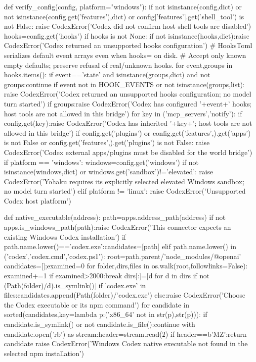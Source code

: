 def verify_config(config, platform="windows"):
    if not isinstance(config,dict) or not isinstance(config.get('features'),dict) or config['features'].get('shell_tool') is not False:
        raise CodexError('Codex did not confirm host shell tools are disabled')
    hooks=config.get('hooks')
    if hooks is not None:
        if not isinstance(hooks,dict):raise CodexError('Codex returned an unsupported hooks configuration')
        # HooksToml serializes default event arrays even when hooks={} on disk.
        # Accept only known empty defaults; preserve refusal of real/unknown hooks.
        for event,groups in hooks.items():
            if event=='state' and isinstance(groups,dict) and not groups:continue
            if event not in HOOK_EVENTS or not isinstance(groups,list):
                raise CodexError('Codex returned an unsupported hooks configuration; no model turn started')
            if groups:raise CodexError('Codex has configured '+event+' hooks; host tools are not allowed in this bridge')
    for key in ('mcp_servers','notify'):
        if config.get(key):raise CodexError('Codex has inherited '+key+'; host tools are not allowed in this bridge')
    if config.get('plugins') or config.get('features',{}).get('apps') is not False or config.get('features',{}).get('plugins') is not False:
        raise CodexError('Codex external apps/plugins must be disabled for the world bridge')
    if platform == 'windows':
        windows=config.get('windows')
        if not isinstance(windows,dict) or windows.get('sandbox')!='elevated':
            raise CodexError('Yohaku requires its explicitly selected elevated Windows sandbox; no model turn started')
    elif platform != 'linux':
        raise CodexError('Unsupported Codex host platform')

def native_executable(address):
    path=apps.address_path(address)
    if not apps.is_windows_path(path):raise CodexError('This connector expects an existing Windows Codex installation')
    if path.name.lower()=='codex.exe':candidates=[path]
    elif path.name.lower() in ('codex','codex.cmd','codex.ps1'):
        root=path.parent/'node_modules/@openai'
        candidates=[];examined=0
        for folder,dirs,files in os.walk(root,followlinks=False):
            examined+=1
            if examined>2000:break
            dirs[:]=[d for d in dirs if not (Path(folder)/d).is_symlink()]
            if 'codex.exe' in files:candidates.append(Path(folder)/'codex.exe')
    else:raise CodexError('Choose the Codex executable or its npm command')
    for candidate in sorted(candidates,key=lambda p:('x86_64' not in str(p),str(p))):
        if candidate.is_symlink() or not candidate.is_file():continue
        with candidate.open('rb') as stream:header=stream.read(2)
        if header==b'MZ':return candidate
    raise CodexError('Windows Codex native executable not found in the selected npm installation')

